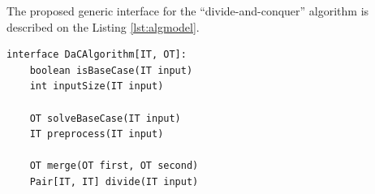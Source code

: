 \documentclass[a4paper,english,numberwithinsect,notab]{eurocg20-submission}
\begin{document}
	The proposed generic interface for the ``divide-and-conquer'' algorithm is described on the Listing \ref{lst:algmodel}.
	
	\begin{lstlisting}[caption={Algorithm model based on the ``divide-and-conquer'' principle},label={lst:algmodel},captionpos=t,float,abovecaptionskip=-\medskipamount]
interface DaCAlgorithm[IT, OT]:
    boolean isBaseCase(IT input)
    int inputSize(IT input)
    
    OT solveBaseCase(IT input)
    IT preprocess(IT input)
    
    OT merge(OT first, OT second)
    Pair[IT, IT] divide(IT input)
	\end{lstlisting}
	
	
	
	
	
	
\end{document}
